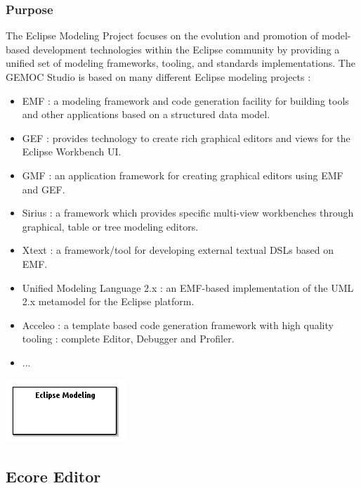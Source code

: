 \documentclass{gemoc} %
\begin{document}
\subsubsection{Purpose}
The Eclipse Modeling Project focuses on the evolution and promotion of model-based development technologies within the Eclipse community by providing a unified set of modeling frameworks, tooling, and standards implementations. The GEMOC Studio is based on many different Eclipse modeling projects :
\begin{itemize}
\item EMF : a modeling framework and code generation facility for building tools and other applications based on a structured data model.
\item GEF : provides technology to create rich graphical editors and views for the Eclipse Workbench UI.
\item GMF : an application framework for creating graphical editors using EMF and GEF.
\item Sirius : a framework which provides specific multi-view workbenches through graphical, table or tree modeling editors.
\item Xtext : a framework/tool for developing external textual DSLs based on EMF.
\item Unified Modeling Language 2.x : an EMF-based implementation of the UML 2.x metamodel for the Eclipse platform.
\item Acceleo : a template based code generation framework with high quality tooling : complete Editor, Debugger and Profiler.
\item ...
\end{itemize}

\begin{center}
\includegraphics*[trim=0.0cm 0.0cm 0cm 0.0cm, clip=true]{../images/generated/Generated_Eclipse_Modeling.png}
\end{center}




\subsection{Ecore Editor}
\label{sec:Ecore_Editor}
\end{document}
